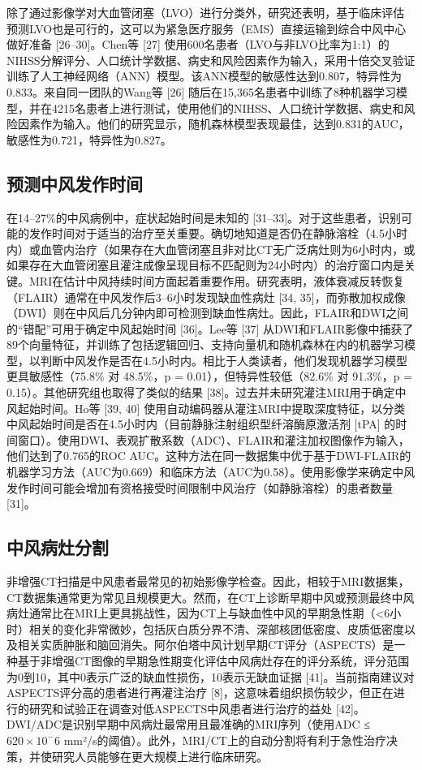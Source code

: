\documentclass[11pt]{article}
\begin{document}
除了通过影像学对大血管闭塞（LVO）进行分类外，研究还表明，基于临床评估预测LVO也是可行的，这可以为紧急医疗服务（EMS）直接运输到综合中风中心做好准备 [26–30]。Chen等 [27] 使用600名患者（LVO与非LVO比率为1:1）的NIHSS分解评分、人口统计学数据、病史和风险因素作为输入，采用十倍交叉验证训练了人工神经网络（ANN）模型。该ANN模型的敏感性达到0.807，特异性为0.833。来自同一团队的Wang等 [26] 随后在15,365名患者中训练了8种机器学习模型，并在4215名患者上进行测试，使用他们的NIHSS、人口统计学数据、病史和风险因素作为输入。他们的研究显示，随机森林模型表现最佳，达到0.831的AUC，敏感性为0.721，特异性为0.827。

\subsection{\kaishu 预测中风发作时间}

在14–27\%的中风病例中，症状起始时间是未知的 [31–33]。对于这些患者，识别可能的发作时间对于适当的治疗至关重要。确切地知道是否仍在静脉溶栓（4.5小时内）或血管内治疗（如果存在大血管闭塞且非对比CT无广泛病灶则为6小时内，或如果存在大血管闭塞且灌注成像呈现目标不匹配则为24小时内）的治疗窗口内是关键。MRI在估计中风持续时间方面起着重要作用。研究表明，液体衰减反转恢复（FLAIR）通常在中风发作后3–6小时发现缺血性病灶 [34, 35]，而弥散加权成像（DWI）则在中风后几分钟内即可检测到缺血性病灶。因此，FLAIR和DWI之间的“错配”可用于确定中风起始时间 [36]。Lee等 [37] 从DWI和FLAIR影像中捕获了89个向量特征，并训练了包括逻辑回归、支持向量机和随机森林在内的机器学习模型，以判断中风发作是否在4.5小时内。相比于人类读者，他们发现机器学习模型更具敏感性（75.8\% 对 48.5\%，p = 0.01），但特异性较低（82.6\% 对 91.3\%，p = 0.15）。其他研究组也取得了类似的结果 [38]。过去并未研究灌注MRI用于确定中风起始时间。Ho等 [39, 40] 使用自动编码器从灌注MRI中提取深度特征，以分类中风起始时间是否在4.5小时内（目前静脉注射组织型纤溶酶原激活剂 [tPA] 的时间窗口）。使用DWI、表观扩散系数（ADC）、FLAIR和灌注加权图像作为输入，他们达到了0.765的ROC AUC。这种方法在同一数据集中优于基于DWI-FLAIR的机器学习方法（AUC为0.669）和临床方法（AUC为0.58）。使用影像学来确定中风发作时间可能会增加有资格接受时间限制中风治疗（如静脉溶栓）的患者数量 [31]。



\subsection{\kaishu  中风病灶分割}

非增强CT扫描是中风患者最常见的初始影像学检查。因此，相较于MRI数据集，CT数据集通常更为常见且规模更大。然而，在CT上诊断早期中风或预测最终中风病灶通常比在MRI上更具挑战性，因为CT上与缺血性中风的早期急性期（<6小时）相关的变化非常微妙，包括灰白质分界不清、深部核团低密度、皮质低密度以及相关实质肿胀和脑回消失。阿尔伯塔中风计划早期CT评分（ASPECTS）是一种基于非增强CT图像的早期急性期变化评估中风病灶存在的评分系统，评分范围为0到10，其中0表示广泛的缺血性损伤，10表示无缺血证据 [41]。当前指南建议对ASPECTS评分高的患者进行再灌注治疗 [8]，这意味着组织损伤较少，但正在进行的研究和试验正在调查对低ASPECTS中风患者进行治疗的益处 [42]。DWI/ADC是识别早期中风病灶最常用且最准确的MRI序列（使用ADC ≤ $620 \times 10^-6$ mm²/s的阈值）。此外，MRI/CT上的自动分割将有利于急性治疗决策，并使研究人员能够在更大规模上进行临床研究。
\end{document}
